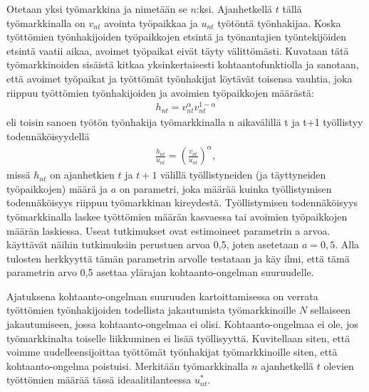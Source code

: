 \documentclass[12pt]{article}
\begin{document}
Otetaan yksi työmarkkina ja nimetään se $n$:ksi. Ajanhetkellä $t$ tällä työmarkkinalla on $v_{nt}$ avointa työpaikkaa ja $u_{nt}$ työtöntä työnhakijaa. Koska työttömien työnhakijoiden työpaikkojen etsintä ja työnantajien työntekijöiden etsintä vaatii aikaa, avoimet työpaikat eivät täyty välittömästi. Kuvataan tätä työmarkkinoiden sisäistä kitkaa yksinkertaisesti kohtaantofunktiolla ja sanotaan, että avoimet työpaikat ja työttömät työnhakijat löytävät toisensa vauhtia, joka riippuu työttömien työnhakijoiden ja avoimien työpaikkojen määrästä: 
\begin{align*}
h_{nt} = v_{nt}^\alpha v_{nt}^{1-\alpha}
\end{align*}
eli toisin sanoen työtön työnhakija työmarkkinalla n aikavälillä t ja t+1 työllistyy todennäköisyydellä 
\begin{align*}
\frac{h_{nt}}{u_{nt}} = \left ( \frac{v_{nt}}{u_{nt}} \right ) ^\alpha,
\end{align*}
missä $h_{nt}$ on ajanhetkien $t$ ja $t+1$ välillä työllistyneiden (ja täyttyneiden työpaikkojen) määrä ja $a$ on parametri, joka määrää kuinka työllistymisen todennäköisyys riippuu työmarkkinan kireydestä. Työllistymisen todennäköisyys työmarkkinalla laskee työttömien määrän kasvaessa tai avoimien työpaikkojen määrän laskiessa. Useat tutkimukset ovat estimoineet parametrin a arvoa.  käyttävät näihin tutkimuksiin perustuen arvoa 0,5, joten asetetaan $a = 0,5$. Alla tulosten herkkyyttä tämän parametrin arvolle testataan ja käy ilmi, että tämä parametrin arvo 0,5 asettaa ylärajan kohtaanto-ongelman suuruudelle.

Ajatuksena kohtaanto-ongelman suuruuden kartoittamisessa on verrata työttömien työnhakijoiden todellista jakautumista työmarkkinoille $N$ sellaiseen jakautumiseen, jossa kohtaanto-ongelmaa ei olisi. Kohtaanto-ongelmaa ei ole, jos työmarkkinalta toiselle liikkuminen ei lisää työllisyyttä. Kuvitellaan siten, että voimme uudelleensijoittaa työttömät työnhakijat työmarkkinoille siten, että kohtaanto-ongelma poistuisi. Merkitään työmarkkinalla $n$ ajanhetkellä $t$ olevien työttömien määrää tässä ideaalitilanteessa $u_{nt}^*$.
\end{document}
